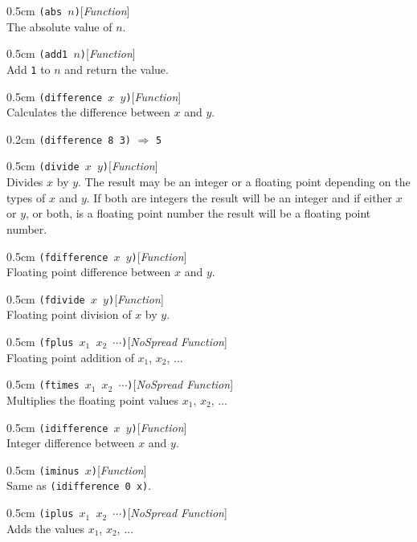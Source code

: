 \documentclass[a4paper]{article}
\newcommand{\lisp}[1]{\texttt{#1}}
\newcommand{\xargs}{$x_{1}$ $x_{2}$ $\cdots$}
\newcommand{\largs}{$x_{1}$, $x_{2}$, $\ldots$}
\newenvironment{defun}[2]{\begin{adjustwidth}{0.5cm}{}
    {\hspace*{-0.5cm}\lisp{#2}\hfill[\textit{#1}]\\}}
               {\end{adjustwidth}}
\newcommand{\example}[2]{
  \begin{adjustwidth}{0.2cm}{}
    \lisp{#1} $\Rightarrow$ \lisp{#2}
  \end{adjustwidth}
}
\begin{document}
\begin{defun}{Function}{(abs $n$)}
  The absolute value of $n$.
\end{defun}

\begin{defun}{Function}{(add1 $n$)}
  Add \lisp{1} to $n$ and return the value.
\end{defun}

\begin{defun}{Function}{(difference $x$ $y$)}
  Calculates the difference between $x$ and $y$.

  \example{(difference 8 3)}{5}
\end{defun}

\begin{defun}{Function}{(divide $x$ $y$)}
  Divides $x$ by $y$. The result may be an integer or a floating point
  depending on the types of $x$ and $y$. If both are integers the
  result will be an integer and if either $x$ or $y$, or both, is a
  floating point number the result will be a floating point number.
\end{defun}

\begin{defun}{Function}{(fdifference $x$ $y$)}
  Floating point difference between $x$ and $y$.
\end{defun}

\begin{defun}{Function}{(fdivide $x$ $y$)}
  Floating point division of $x$ by $y$.
\end{defun}

\begin{defun}{NoSpread Function}{(fplus \xargs)}
  Floating point addition of \largs
\end{defun}

\begin{defun}{NoSpread Function}{(ftimes \xargs)}
  Multiplies the floating point values \largs
\end{defun}

\begin{defun}{Function}{(idifference $x$ $y$)}
  Integer difference between $x$ and $y$.
\end{defun}

\begin{defun}{Function}{(iminus $x$)}
  Same as \lisp{(idifference 0 x)}.
\end{defun}

\begin{defun}{NoSpread Function}{(iplus \xargs)}
  Adds the values \largs
\end{defun}
\end{document}
